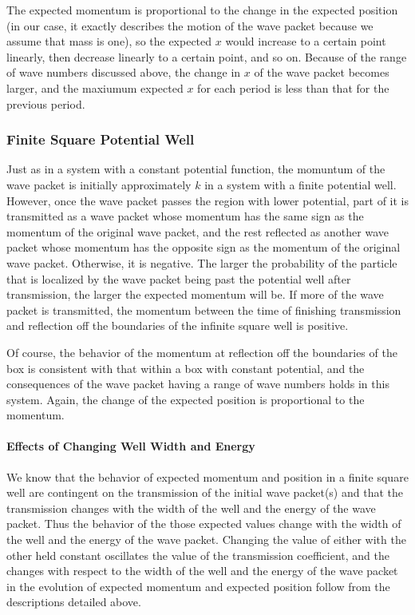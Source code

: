 \documentclass[letterpaper,12pt]{article}
\begin{document}
    The expected momentum is proportional to the change in the expected
    position (in our case, it exactly describes the motion of the wave packet
    because we assume that mass is one), so the expected $x$ would increase to a
    certain point linearly, then decrease linearly to a certain point, and so
    on. Because of the range of wave numbers discussed above, the
    change in $x$ of the wave packet becomes larger, and the maxiumum expected
    $x$ for each period is less than that for the previous period.

    \subsubsection*{Finite Square Potential Well}

    Just as in a system with a constant potential function, the momuntum of the
    wave packet is initially approximately $k$ in a system with a finite
    potential well. However, once the wave packet passes the region with lower
    potential, part of it is transmitted as a wave packet whose momentum has the
    same sign as the momentum of the original wave packet, and the rest
    reflected as another wave packet whose momentum has the opposite sign as the
    momentum of the original wave packet. Otherwise, it is
    negative. The larger the probability of the particle that is localized by
    the wave packet being past the potential well after transmission, the larger
    the expected momentum will be. If more of the wave packet is
    transmitted, the momentum between the time of finishing transmission and
    reflection off
    the boundaries of the infinite square well is positive.

    Of course, the behavior of the momentum at reflection off the boundaries of
    the box is consistent with that within a box with constant potential, and
    the consequences of the wave packet having a range of wave numbers holds in
    this system. Again, the change of the expected position is proportional to
    the momentum.

    \paragraph{Effects of Changing Well Width and Energy}  We know that
    the behavior of expected momentum and position in a finite square well are
    contingent on the transmission of the initial wave packet(s) and that the
    transmission changes with the width of the well and the energy of the wave
    packet. Thus the behavior of the those expected values change with the width
    of the well and the energy of the wave packet. Changing the value of either
    with the other held constant oscillates the value of the transmission
    coefficient, and the changes with respect to the width of the well and
    the energy of the wave packet in the evolution of expected
    momentum and expected position follow from the descriptions detailed above.
\end{document}
